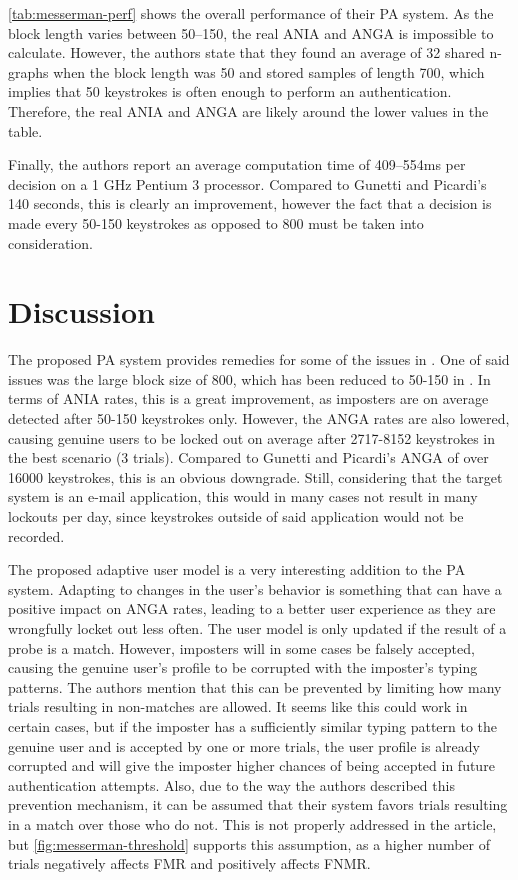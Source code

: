 \documentclass[informationsecurity]{gucmasterproject}
\begin{document}
\cref{tab:messerman-perf} shows the overall performance of their PA system.
As the block length varies between 50--150, the real ANIA and ANGA is impossible to calculate.
However, the authors state that they found an average of 32 shared n-graphs when the block length was 50 and stored samples of length 700, which implies that 50 keystrokes is often enough to perform an authentication.
Therefore, the real ANIA and ANGA are likely around the lower values in the table.

Finally, the authors report an average computation time of 409--554ms per decision on a 1 GHz Pentium 3 processor. 
Compared to Gunetti and Picardi's 140 seconds, this is clearly an improvement, however the fact that a decision is made every 50-150 keystrokes as opposed to 800 must be taken into consideration.

\section{Discussion}
The proposed PA system provides remedies for some of the issues in \cite{gnp}.
One of said issues was the large block size of 800, which has been reduced to 50-150 in \cite{Messerman}.
In terms of ANIA rates, this is a great improvement, as imposters are on average detected after 50-150 keystrokes only.
However, the ANGA rates are also lowered, causing genuine users to be locked out on average after 2717-8152 keystrokes in the best scenario (3 trials).
Compared to Gunetti and Picardi's ANGA of over 16000 keystrokes, this is an obvious downgrade.
Still, considering that the target system is an e-mail application, this would in many cases not result in many lockouts per day, since keystrokes outside of said application would not be recorded.

The proposed adaptive user model is a very interesting addition to the PA system.
Adapting to changes in the user's behavior is something that can have a positive impact on ANGA rates, leading to a better user experience as they are wrongfully locket out less often.
The user model is only updated if the result of a probe is a match.
However, imposters will in some cases be falsely accepted, causing the genuine user's profile to be corrupted with the imposter's typing patterns.
The authors mention that this can be prevented by limiting how many trials resulting in non-matches are allowed.
It seems like this could work in certain cases, but if the imposter has a sufficiently similar typing pattern to the genuine user and is accepted by one or more trials, the user profile is already corrupted and will give the imposter higher chances of being accepted in future authentication attempts.
Also, due to the way the authors described this prevention mechanism, it can be assumed that their system favors trials resulting in a match over those who do not.
This is not properly addressed in the article, but \cref{fig:messerman-threshold} supports this assumption, as a higher number of trials negatively affects FMR and positively affects FNMR.
\end{document}
